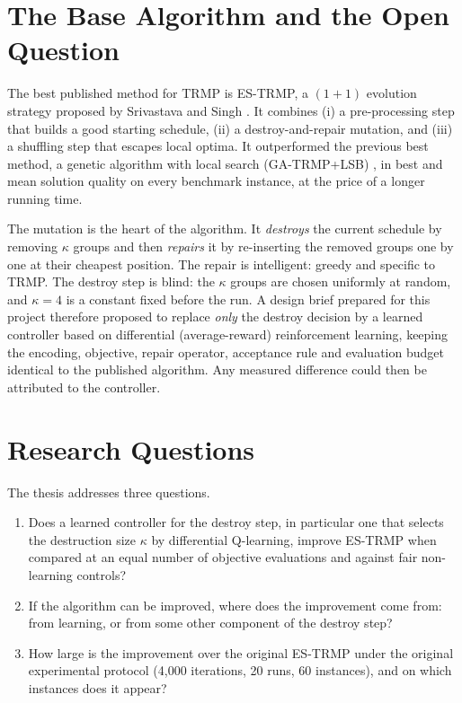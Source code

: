 
\section{The Base Algorithm and the Open Question}

The best published method for TRMP is ES-TRMP, a $(1+1)$ evolution strategy proposed by Srivastava and Singh \cite{srivastava2018}. It combines (i) a pre-processing step that builds a good starting schedule, (ii) a destroy-and-repair mutation, and (iii) a shuffling step that escapes local optima. It outperformed the previous best method, a genetic algorithm with local search (GA-TRMP+LSB) \cite{singh2015}, in best and mean solution quality on every benchmark instance, at the price of a longer running time.

The mutation is the heart of the algorithm. It \emph{destroys} the current schedule by removing $\kappa$ groups and then \emph{repairs} it by re-inserting the removed groups one by one at their cheapest position. The repair is intelligent: greedy and specific to TRMP. The destroy step is blind: the $\kappa$ groups are chosen uniformly at random, and $\kappa=4$ is a constant fixed before the run. A design brief prepared for this project therefore proposed to replace \emph{only} the destroy decision by a learned controller based on differential (average-reward) reinforcement learning, keeping the encoding, objective, repair operator, acceptance rule and evaluation budget identical to the published algorithm. Any measured difference could then be attributed to the controller.


\section{Research Questions}

The thesis addresses three questions.

\begin{enumerate}
\item[\textbf{RQ1}] Does a learned controller for the destroy step, in particular one that selects the destruction size $\kappa$ by differential Q-learning, improve ES-TRMP when compared at an equal number of objective evaluations and against fair non-learning controls?
\item[\textbf{RQ2}] If the algorithm can be improved, where does the improvement come from: from learning, or from some other component of the destroy step?
\item[\textbf{RQ3}] How large is the improvement over the original ES-TRMP under the original experimental protocol (4{,}000 iterations, 20 runs, 60 instances), and on which instances does it appear?
\end{enumerate}

